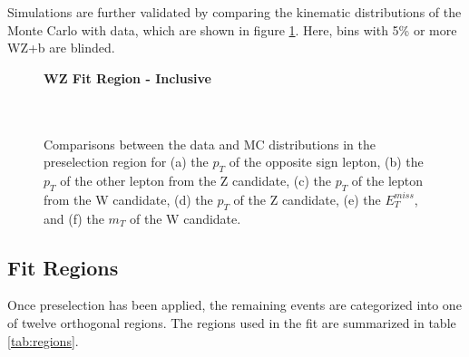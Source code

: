 Simulations are further validated by comparing the kinematic distributions of the Monte Carlo with data, which are shown in figure \ref{kin:inclusive}. Here, bins with 5\% or more WZ+b are blinded.


\begin{figure}[H] 
    \centering
    \textbf{WZ Fit Region - Inclusive}\\
    \\      
    \\
    \caption{Comparisons between the data and MC distributions in the preselection region for (a) the $p_T$ of the opposite sign lepton, (b) the $p_T$ of the other lepton from the Z candidate, (c) the $p_T$ of the lepton from the W candidate, (d) the $p_T$ of the Z candidate, (e) the $E_T^{miss}$, and (f) the $m_T$ of the W candidate.}
    \label{kin:inclusive}
\end{figure}

\subsection{Fit Regions}
\label{subsec:regions}

Once preselection has been applied, the remaining events are categorized into one of twelve orthogonal regions. The regions used in the fit are summarized in table \ref{tab:regions}.

